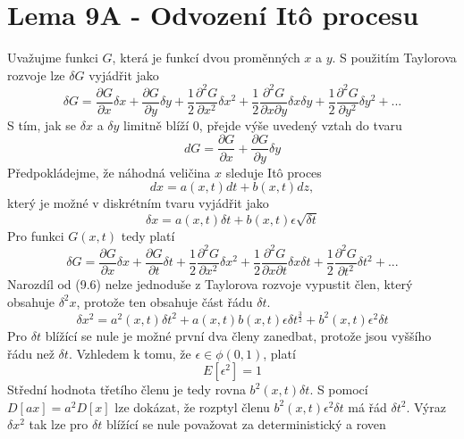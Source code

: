 \documentclass[a4paper]{book}
\begin{document}
\section{Lema 9A - Odvození It\^o procesu}

Uvažujme funkci $G$, která je funkcí dvou proměnných $x$ a $y$. S použitím Taylorova rozvoje lze $\delta G$ vyjádřit jako
\begin{equation}
\delta G = \frac{\partial G}{\partial x}\delta x + \frac{\partial G}{\partial y}\delta y + \frac{1}{2}\frac{\partial^2 G}{\partial x^2}\delta x^2 + \frac{1}{2}\frac{\partial^2 G}{\partial x \partial y}\delta x \delta y + \frac{1}{2}\frac{\partial^2 G}{\partial y^2}\delta y^2 + ...
\end{equation}
S tím, jak se $\delta x$ a $\delta y$ limitně blíží 0, přejde výše uvedený vztah do tvaru
\begin{equation*}
d G = \frac{\partial G}{\partial x} + \frac{\partial G}{\partial y}\delta y
\end{equation*}
Předpokládejme, že náhodná veličina $x$ sleduje It\^o proces
\begin{equation*}
dx = a(x,t)dt + b(x,t)dz,
\end{equation*}
který je možné v diskrétním tvaru vyjádřit jako
\begin{equation*}
\delta x = a(x,t)\delta t + b(x,t) \epsilon \sqrt{\delta t}
\end{equation*}
Pro funkci $G(x,t)$ tedy platí
\begin{equation}
\delta G = \frac{\partial G}{\partial x}\delta x + \frac{\partial G}{\partial t}\delta t + \frac{1}{2}\frac{\partial^2 G}{\partial x^2}\delta x^2 + \frac{1}{2}\frac{\partial^2 G}{\partial x \partial t}\delta x \delta t + \frac{1}{2}\frac{\partial^2 G}{\partial t^2}\delta t^2 + ...
\end{equation}
Narozdíl od (9.6) nelze jednoduše z Taylorova rozvoje vypustit člen, který obsahuje $\delta^2 x$, protože ten obsahuje část řádu $\delta t$.
\begin{equation*}
\delta x^2 = a^2(x,t)\delta t^2 + a(x,t)b(x,t) \epsilon \delta t^\frac{3}{2} + b^2(x,t) \epsilon^2 \delta t
\end{equation*}
Pro $\delta t$ blížící se nule je možné první dva členy zanedbat, protože jsou vyššího řádu než $\delta t$. Vzhledem k tomu, že $\epsilon \in \phi(0,1)$, platí
\begin{equation*}
E[\epsilon^2]=1
\end{equation*}
Střední hodnota třetího členu je tedy rovna $b^2(x,t) \delta t$. S pomocí $D[ax]= a^2D[x]$ lze dokázat, že rozptyl členu $b^2(x,t) \epsilon^2 \delta t$ má řád $\delta t^2$. Výraz $\delta x^2$ tak lze pro $\delta t$ blížící se nule považovat za deterministický a roven
\end{document}
